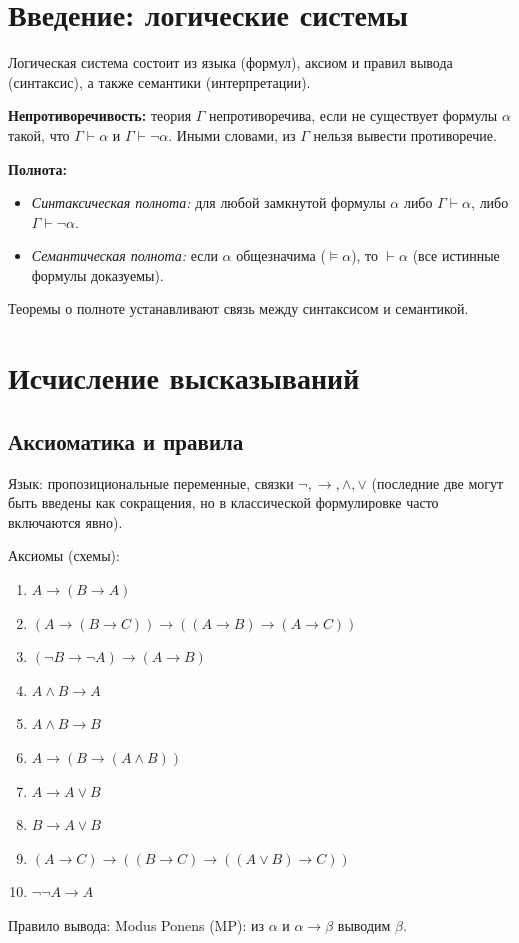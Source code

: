 \documentclass[10pt]{article}
\begin{document}
\section{Введение: логические системы}
Логическая система состоит из языка (формул), аксиом и правил вывода (синтаксис), а также семантики (интерпретации). 

\textbf{Непротиворечивость:} теория $\Gamma$ непротиворечива, если не существует формулы $\alpha$ такой, что $\Gamma \vdash \alpha$ и $\Gamma \vdash \neg\alpha$. Иными словами, из $\Gamma$ нельзя вывести противоречие.

\textbf{Полнота:}
\begin{itemize}
  \item \textit{Синтаксическая полнота:} для любой замкнутой формулы $\alpha$ либо $\Gamma\vdash\alpha$, либо $\Gamma\vdash\neg\alpha$.
  \item \textit{Семантическая полнота:} если $\alpha$ общезначима ($\models\alpha$), то $\vdash\alpha$ (все истинные формулы доказуемы).
\end{itemize}
Теоремы о полноте устанавливают связь между синтаксисом и семантикой.

\section{Исчисление высказываний}
\subsection{Аксиоматика и правила}
Язык: пропозициональные переменные, связки $\neg,\rightarrow,\land,\lor$ (последние две могут быть введены как сокращения, но в классической формулировке часто включаются явно). 

Аксиомы (схемы):
\begin{enumerate}
  \item $A \rightarrow (B \rightarrow A)$
  \item $(A \rightarrow (B \rightarrow C)) \rightarrow ((A \rightarrow B) \rightarrow (A \rightarrow C))$
  \item $(\neg B \rightarrow \neg A) \rightarrow (A \rightarrow B)$
  \item $A \land B \rightarrow A$
  \item $A \land B \rightarrow B$
  \item $A \rightarrow (B \rightarrow (A \land B))$
  \item $A \rightarrow A \lor B$
  \item $B \rightarrow A \lor B$
  \item $(A \rightarrow C) \rightarrow ((B \rightarrow C) \rightarrow ((A \lor B) \rightarrow C))$
  \item $\neg \neg A \rightarrow A$
\end{enumerate}
Правило вывода: Modus Ponens (MP): из $\alpha$ и $\alpha\rightarrow\beta$ выводим $\beta$.
\end{document}
